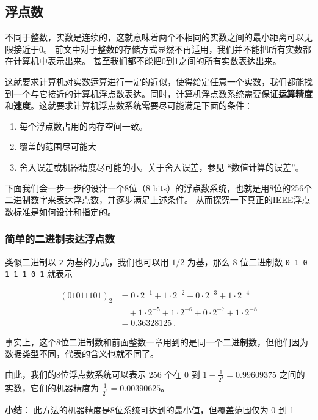 \subsection{浮点数}

不同于整数，实数是连续的，这就意味着两个不相同的实数之间的最小距离可以无限接近于0。 前文中对于整数的存储方式显然不再适用，我们并不能把所有实数都在计算机中表示出来。 甚至我们都不能把0到1之间的所有实数表达出来。

这就要求计算机对实数运算进行一定的近似，使得给定任意一个实数，我们都能找到一个与它接近的计算机浮点数表达。同时，计算机浮点数系统需要保证\textbf{运算精度}和\textbf{速度}。这就要求计算机浮点数系统需要尽可能满足下面的条件：

\begin{enumerate}
\item 每个浮点数占用的内存空间一致。
\item 覆盖的范围尽可能大
\item 舍入误差或机器精度尽可能的小。关于舍入误差，参见 “数值计算的误差”。
\end{enumerate}

下面我们会一步一步的设计一个8位（8 bits）的浮点数系统，也就是用8位的256个二进制数字来表达浮点数，并逐步满足上述条件。 从而探究一下真正的IEEE浮点数标准是如何设计和指定的。

\subsubsection{简单的二进制表达浮点数}

类似二进制以 \verb|2| 为基的方式，我们也可以用 $1/2$ 为基，那么 8 位二进制数 \verb|0 1 0 1 1 1 0 1| 就表示

\begin{equation}
\begin{aligned}
(01011101)_2 &= 0\cdot2^{-1}+1\cdot2^{-2}+0\cdot2^{-3}+1\cdot2^{-4}\\
 &\quad +1\cdot2^{-5}+1\cdot2^{-6}+0\cdot2^{-7}+1\cdot2^{-8}\\
 &= 0.36328125~.
\end{aligned}
\end{equation}

事实上，这个8位二进制数和前面整数一章用到的是同一个二进制数，但他们因为数据类型不同，代表的含义也就不同了。

由此，我们的8位浮点数系统可以表示 256 个在 0 到  $1-\frac{1}{2^8}=0.99609375$  之间的实数，它们的机器精度为  $\frac{1}{2^8}=0.00390625$。

\textbf{小结}： 此方法的机器精度是8位系统可达到的最小值，但覆盖范围仅为 0 到 1

